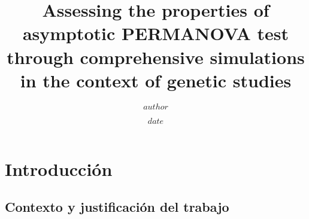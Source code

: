 \documentclass[IB,BIB]{TFUOC}%
\title{Assessing the properties of asymptotic \break PERMANOVA test through comprehensive \break simulations in the context of genetic studies} %
\author{$author$} %
\date{$date$}
\let\oldgls=\gls
\renewcommand{\gls}[1]{{\hypersetup{linkcolor=[RGB]{0,0,0}}
  \oldgls{#1}}}
\begin{document}
\estructura\label{fitxa}

\renewcommand{\bibname}{Referencias}  
\renewcommand{\tablename}{Tabla}
\renewcommand{\figurename}{Figura}
\renewcommand{\listfigurename}{Índice de figuras}
\renewcommand{\listtablename}{Índice de tablas}

\renewcommand*{\glstextformat}{\textbf}

\newpage

\clearpage
{}

\tableofcontents


\newpage

\listoffigures


\newpage

\listoftables


\newpage

\listofmyequations





\chapter{Introducción}
\label{chap:Introducción}



\section{Contexto y justificación del trabajo}
\label{sec:Contexto y justificación del trabajo}

\end{document}
